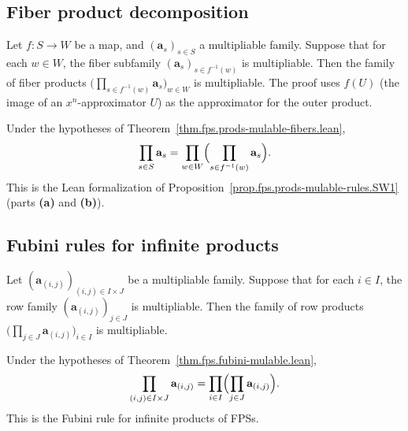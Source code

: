 \subsection{Fiber product decomposition}

\begin{theorem}
\label{thm.fps.prods-mulable-fibers.lean}
\leanhelper
\leanok
Let $f : S \to W$ be a map, and $(\mathbf{a}_s)_{s \in S}$ a multipliable family.
Suppose that for each $w \in W$, the fiber subfamily
$(\mathbf{a}_s)_{s \in f^{-1}(w)}$ is multipliable.
Then the family of fiber products
$\bigl(\prod_{s \in f^{-1}(w)} \mathbf{a}_s\bigr)_{w \in W}$ is multipliable.
The proof uses $f(U)$ (the image of an $x^n$-approximator $U$) as the approximator
for the outer product.
\end{theorem}

\begin{theorem}
\label{thm.fps.prods-mulable-fibers-eq.lean}
\leanhelper
\leanok
Under the hypotheses of Theorem~\ref{thm.fps.prods-mulable-fibers.lean},
\[
\prod_{s \in S} \mathbf{a}_s
= \prod_{w \in W} \Bigl(\prod_{s \in f^{-1}(w)} \mathbf{a}_s\Bigr).
\]
This is the Lean formalization of Proposition~\ref{prop.fps.prods-mulable-rules.SW1}
(parts \textbf{(a)} and \textbf{(b)}).
\end{theorem}

\subsection{Fubini rules for infinite products}

\begin{theorem}
\label{thm.fps.fubini-mulable.lean}
\leanhelper
\leanok
Let $(\mathbf{a}_{(i,j)})_{(i,j) \in I \times J}$ be a multipliable family.
Suppose that for each $i \in I$, the row family $(\mathbf{a}_{(i,j)})_{j \in J}$
is multipliable. Then the family of row products
$\bigl(\prod_{j \in J} \mathbf{a}_{(i,j)}\bigr)_{i \in I}$ is multipliable.
\end{theorem}

\begin{theorem}
\label{thm.fps.fubini.lean}
\leanhelper
\leanok
Under the hypotheses of Theorem~\ref{thm.fps.fubini-mulable.lean},
\[
\prod_{(i,j) \in I \times J} \mathbf{a}_{(i,j)}
= \prod_{i \in I} \Bigl(\prod_{j \in J} \mathbf{a}_{(i,j)}\Bigr).
\]
This is the Fubini rule for infinite products of FPSs.
\end{theorem}

